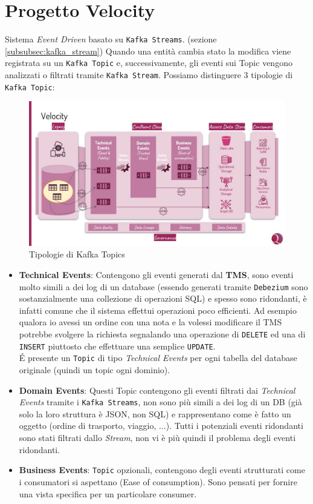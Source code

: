 \section{Progetto Velocity}
\label{sec:T&T_new}
Sistema \textit{Event Driven} basato su \texttt{Kafka Streams}. (sezione \ref{subsubsec:kafka_stream})
Quando una entità cambia stato la modifica viene registrata su un \texttt{Kafka Topic} e, successivamente, gli eventi sui Topic vengono analizzati o filtrati tramite \texttt{Kafka Stream}.
Possiamo distinguere 3 tipologie di \texttt{Kafka Topic}:
\begin{figure}[H]
    \centering
    \includegraphics[scale=0.5]{images/architecture/confluent_velocity.jpg}
    \caption{Tipologie di Kafka Topics}
    \label{fig:kafka_topics.img}
\end{figure}
\begin{itemize}
    \item \textbf{Technical Events}: Contengono gli eventi generati dal \textbf{TMS}, sono eventi molto simili a dei log di un database
    (essendo generati tramite \texttt{Debezium} sono sostanzialmente una collezione di operazioni SQL) e spesso sono ridondanti, è
    infatti comune che il sistema effettui operazioni poco efficienti.
    Ad esempio qualora io avessi un ordine con una nota e la volessi modificare il TMS potrebbe svolgere la richiesta segnalando una operazione di \texttt{DELETE} ed una di \texttt{INSERT} piuttosto che effettuare una semplice \texttt{UPDATE}.\\
    É presente un \texttt{Topic} di tipo \textit{Technical Events} per ogni tabella del database originale (quindi un topic ogni dominio).
    \item \textbf{Domain Events}: Questi Topic contengono gli eventi filtrati dai \textit{Technical Events} tramite i \texttt{Kafka Streams}, non sono più simili a dei log di un DB (già solo la loro struttura è JSON, non SQL) e rappresentano come è fatto un oggetto (ordine di trasporto, viaggio, ...). 
    Tutti i potenziali eventi ridondanti sono stati filtrati dallo \textit{Stream}, non vi è più quindi il problema degli eventi ridondanti.
    \item \textbf{Business Events}: \texttt{Topic} opzionali, contengono degli eventi strutturati come i consumatori si aspettano (Ease of consumption). Sono pensati per fornire una vista specifica per un particolare consumer.
\end{itemize}

